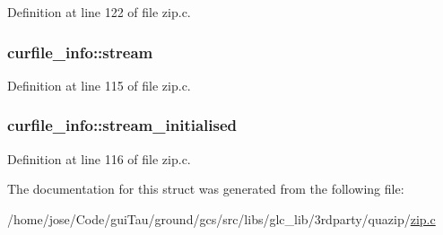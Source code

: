 Definition at line 122 of file zip.\-c.

\hypertarget{structcurfile__info_a902dbbcce2f8a9b5d5f0ac705f9c914c}{
\subsubsection[{stream}]{ curfile\-\_\-info\-::stream}}\label{structcurfile__info_a902dbbcce2f8a9b5d5f0ac705f9c914c}


Definition at line 115 of file zip.\-c.

\hypertarget{structcurfile__info_a4408645945defb3e3e72fd354d4e98b2}{
\subsubsection[{stream\-\_\-initialised}]{ curfile\-\_\-info\-::stream\-\_\-initialised}}\label{structcurfile__info_a4408645945defb3e3e72fd354d4e98b2}


Definition at line 116 of file zip.\-c.



The documentation for this struct was generated from the following file\-:\begin{DoxyCompactItemize}
\item 
/home/jose/\-Code/gui\-Tau/ground/gcs/src/libs/glc\-\_\-lib/3rdparty/quazip/\hyperlink{zip_8c}{zip.\-c}\end{DoxyCompactItemize}
